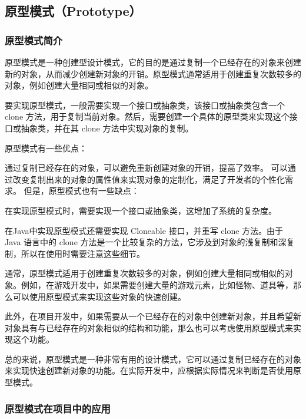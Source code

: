 \subsection{原型模式（Prototype）}

\subsubsection{原型模式简介}

原型模式是一种创建型设计模式，它的目的是通过复制一个已经存在的对象来创建新的对象，从而减少创建新对象的开销。原型模式通常适用于创建重复次数较多的对象，例如创建大量相同或相似的对象。

要实现原型模式，一般需要实现一个接口或抽象类，该接口或抽象类包含一个 clone 方法，用于复制当前对象。然后，需要创建一个具体的原型类来实现这个接口或抽象类，并在其 clone 方法中实现对象的复制。

原型模式有一些优点：

通过复制已经存在的对象，可以避免重新创建对象的开销，提高了效率。
可以通过改变复制出来的对象的属性值来实现对象的定制化，满足了开发者的个性化需求。
但是，原型模式也有一些缺点：

在实现原型模式时，需要实现一个接口或抽象类，这增加了系统的复杂度。

在Java中实现原型模式还需要实现 Cloneable 接口，并重写 clone 方法。由于 Java 语言中的 clone 方法是一个比较复杂的方法，它涉及到对象的浅复制和深复制，所以在使用时需要注意这些细节。

通常，原型模式适用于创建重复次数较多的对象，例如创建大量相同或相似的对象。例如，在游戏开发中，如果需要创建大量的游戏元素，比如怪物、道具等，那么可以使用原型模式来实现这些对象的快速创建。

此外，在项目开发中，如果需要从一个已经存在的对象中创建新对象，并且希望新对象具有与已经存在的对象相似的结构和功能，那么也可以考虑使用原型模式来实现这个功能。

总的来说，原型模式是一种非常有用的设计模式，它可以通过复制已经存在的对象来实现快速创建新对象的功能。在实际开发中，应根据实际情况来判断是否使用原型模式。

\subsubsection{原型模式在项目中的应用}

